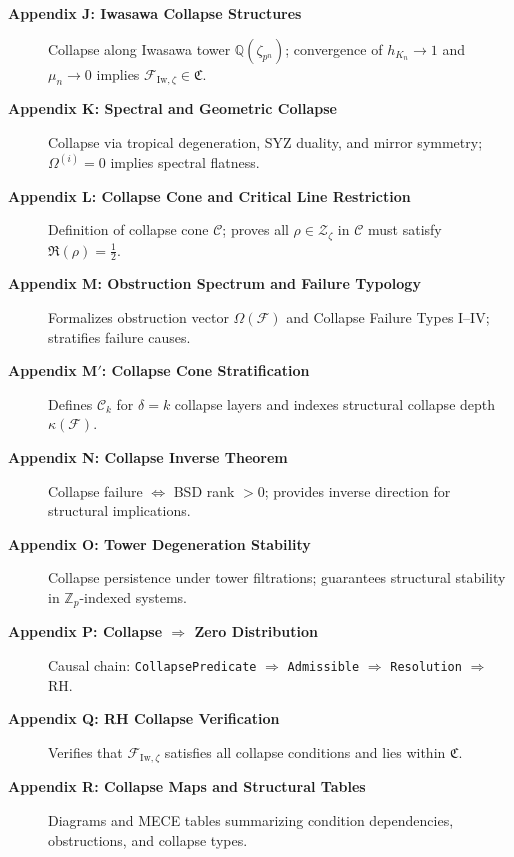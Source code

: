 \documentclass[11pt]{article}
\begin{document}
\begin{description}
  \item[\textbf{Appendix J: Iwasawa Collapse Structures}]  
  Collapse along Iwasawa tower $\mathbb{Q}(\zeta_{p^n})$; convergence of $h_{K_n} \to 1$ and $\mu_n \to 0$ implies $\mathcal{F}_{\mathrm{Iw},\zeta} \in \mathfrak{C}$.

  \item[\textbf{Appendix K: Spectral and Geometric Collapse}]  
  Collapse via tropical degeneration, SYZ duality, and mirror symmetry; $\Omega^{(i)} = 0$ implies spectral flatness.

  \item[\textbf{Appendix L: Collapse Cone and Critical Line Restriction}]  
  Definition of collapse cone $\mathcal{C}$; proves all $\rho \in \mathcal{Z}_\zeta$ in $\mathcal{C}$ must satisfy $\Re(\rho) = \tfrac{1}{2}$.

  \item[\textbf{Appendix M: Obstruction Spectrum and Failure Typology}]  
  Formalizes obstruction vector $\Omega(\mathcal{F})$ and Collapse Failure Types I–IV; stratifies failure causes.

  \item[\textbf{Appendix M$'$: Collapse Cone Stratification}]  
  Defines $\mathcal{C}_k$ for $\delta = k$ collapse layers and indexes structural collapse depth $\kappa(\mathcal{F})$.

  \item[\textbf{Appendix N: Collapse Inverse Theorem}]  
  Collapse failure $\Leftrightarrow$ BSD rank $> 0$; provides inverse direction for structural implications.

  \item[\textbf{Appendix O: Tower Degeneration Stability}]  
  Collapse persistence under tower filtrations; guarantees structural stability in $\mathbb{Z}_p$-indexed systems.

  \item[\textbf{Appendix P: Collapse $\Rightarrow$ Zero Distribution}]  
  Causal chain: \texttt{CollapsePredicate} $\Rightarrow$ \texttt{Admissible} $\Rightarrow$ \texttt{Resolution} $\Rightarrow$ RH.

  \item[\textbf{Appendix Q: RH Collapse Verification}]  
  Verifies that $\mathcal{F}_{\mathrm{Iw},\zeta}$ satisfies all collapse conditions and lies within $\mathfrak{C}$.

  \item[\textbf{Appendix R: Collapse Maps and Structural Tables}]  
  Diagrams and MECE tables summarizing condition dependencies, obstructions, and collapse types.


\end{description}
\end{document}

